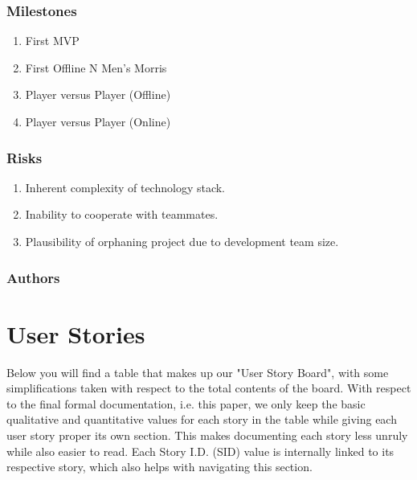 \documentclass[11pt]{article}
\begin{document}
\subsubsection*{Milestones}
\label{sec:org08f1ef8}
\begin{enumerate}
\item First MVP
\item First Offline N Men's Morris
\item Player versus Player (Offline)
\item Player versus Player (Online)
\end{enumerate}
\subsubsection*{Risks}
\label{sec:org377620d}
\begin{enumerate}
\item Inherent complexity of technology stack.
\item Inability to cooperate with teammates.
\item Plausibility of orphaning project due to development team size.
\end{enumerate}
\subsubsection*{Authors}
\label{sec:orgfc7eed1}
\section{User Stories}
\label{sec:orgb72f50b}
Below you will find a table that makes up our "User Story Board", with some simplifications taken
with respect to the total contents of the board. With respect to the final formal documentation,
i.e. this paper, we only keep the basic qualitative and quantitative values for each story in the
table while giving each user story proper its own section. This makes documenting each story
less unruly while also easier to read. Each Story I.D. (SID) value is internally linked to its
respective story, which also helps with navigating this section.
\end{document}
